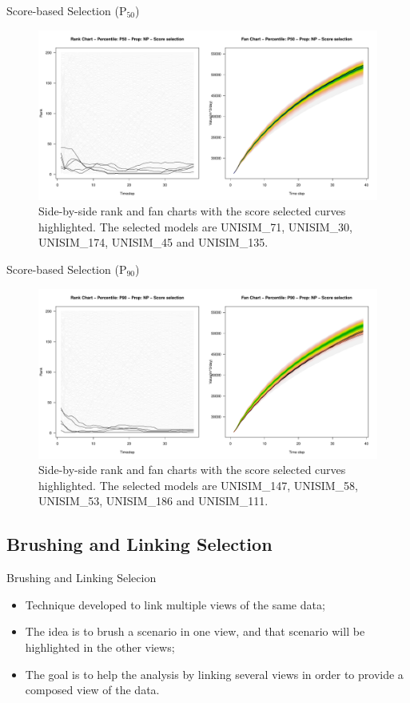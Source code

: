 \documentclass{beamer}
\begin{document}
\begin{frame}{Score-based Selection (P$_{50}$)}
  \begin{figure}[H]
    \centering
    \includegraphics[width=0.9\columnwidth]{rank-fan-score-p50.pdf}
    \caption{Side-by-side rank and fan charts with the score selected curves highlighted. The selected models are UNISIM\_71, UNISIM\_30, UNISIM\_174, UNISIM\_45 and UNISIM\_135.}
    \label{fig:rank-fan-score-p50}
  \end{figure}
\end{frame}

\begin{frame}{Score-based Selection (P$_{90}$)}
  \begin{figure}[H]
    \centering
    \includegraphics[width=0.9\columnwidth]{rank-fan-score-p90.pdf}
    \caption{Side-by-side rank and fan charts with the score selected curves highlighted. The selected models are UNISIM\_147, UNISIM\_58, UNISIM\_53, UNISIM\_186 and UNISIM\_111.}
    \label{fig:rank-fan-score-p90}
  \end{figure}
\end{frame}

\subsection{Brushing and Linking Selection}
\begin{frame}{Brushing and Linking Selecion}
  \begin{itemize}
    \item Technique developed to link multiple views of the same data;
    \item The idea is to brush a scenario in one view, and that scenario will be highlighted in the other views;
    \item The goal is to help the analysis by linking several views in order to provide a composed view of the data.
  \end{itemize}
\end{frame}
\end{document}
